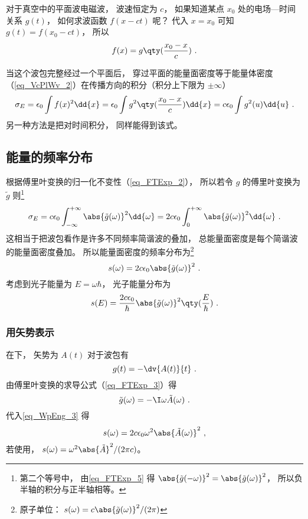 

对于真空中的平面波电磁波， 波速恒定为 $c$， 如果知道某点 $x_0$ 处的电场—时间关系 $g(t)$， 如何求波函数 $f(x - ct)$ 呢？ 代入 $x = x_0$ 可知 $g(t) = f(x_0 - ct)$， 所以
\begin{equation}
f(x) = g\qty(\frac{x_0 - x}{c})~.
\end{equation}

当这个波包完整经过一个平面后， 穿过平面的能量面密度等于能量体密度（\autoref{eq_VcPlWv_2}）在传播方向的积分（积分上下限为 $\pm\infty$）
\begin{equation}\label{eq_WpEng_1}
\sigma_E = \epsilon_0 \int f(x)^2 \dd{x} = \epsilon_0  \int g^2\qty(\frac{x_0 - x}{c}) \dd{x} = c\epsilon_0 \int g^2(u) \dd{u}~.
\end{equation}
另一种方法是把对时间积分， 同样能得到该式。

\subsection{能量的频率分布}
根据傅里叶变换的归一化不变性（\autoref{eq_FTExp_2}）， 所以若令 $g$ 的傅里叶变换为 $\tilde g$ 则\footnote{第二个等号中， 由\autoref{eq_FTExp_5} 得 $\abs{\tilde g(-\omega)}^2 = \abs{\tilde g(\omega)}^2$， 所以负半轴的积分与正半轴相等。}
\begin{equation}
\sigma_E = c\epsilon_0 \int_{-\infty}^{+\infty} \abs{\tilde g(\omega)}^2 \dd{\omega} = 2c\epsilon_0 \int_{0}^{+\infty} \abs{\tilde g(\omega)}^2 \dd{\omega}~.
\end{equation}
这相当于把波包看作是许多不同频率简谐波的叠加， 总能量面密度是每个简谐波的能量面密度叠加。 所以能量面密度的频率分布为\footnote{原子单位： $s(\omega) = c \abs{\tilde g(\omega)}^2/(2\pi)$}
\begin{equation}\label{eq_WpEng_3}
s(\omega) = 2c\epsilon_0 \abs{\tilde g(\omega)}^2~.
\end{equation}
考虑到光子能量为 $E = \omega\hbar$， 光子能量分布为
\begin{equation}\label{eq_WpEng_2}
s(E) = \frac{2c\epsilon_0}{\hbar} \abs{\tilde g(\omega)}^2 \qty(\frac{E}{\hbar})~.
\end{equation}

\subsubsection{用矢势表示}
在下， 矢势为 $A(t)$ 对于波包有
\begin{equation}
g(t) = -\dv{A(t)}{t}~.
\end{equation}
由傅里叶变换的求导公式（\autoref{eq_FTExp_3}）得
\begin{equation}\label{eq_WpEng_4}
\tilde g(\omega) = -\I \omega \tilde A(\omega)~.
\end{equation}
代入\autoref{eq_WpEng_3} 得
\begin{equation}\label{eq_WpEng_5}
s(\omega) = 2c\epsilon_0 \omega^2 \abs{\tilde A(\omega)}^2~,
\end{equation}
若使用， $s(\omega) = \omega^2 \abs{\tilde A}^2/(2\pi c)$。
